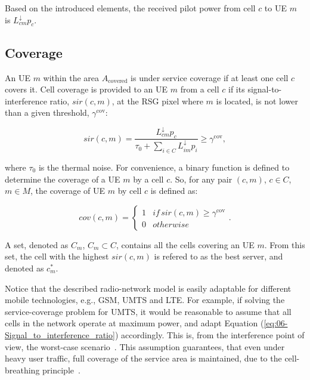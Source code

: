 Based on the introduced elements, the received pilot power from cell
$c$ to UE $m$ is $L_{cm}^{\downarrow}p_{c}$.


\subsection{Coverage}

An UE $m$ within the area $A_{\mathrm{covered}}$ is under service
coverage if at least one cell $c$ covers it. Cell coverage is provided
to an UE $m$ from a cell $c$ if its signal-to-interference ratio,
$sir(c,m)$,
at the RSG pixel where $m$ is located, is not lower than a given
threshold, $\gamma^{\mathrm{cov}}$:

\begin{equation}
sir(c,m)=\frac{L_{cm}^{\downarrow}p_{c}}{\tau_{0}+\sum_{i\in C}L_{im}^{\downarrow}p_{i}}\ge\gamma^{\mathrm{cov}},\label{eq:06-Signal_to_interference_ratio}
\end{equation}


\noindent where $\tau_{0}$ is the thermal noise. For convenience,
a binary function is defined to determine the coverage of a UE $m$
by a cell $c$. So, for any pair $(c,m)$, $c\in C$, $m\in M$, the
coverage of UE $m$ by cell $c$ is defined as:

\begin{equation}
cov(c,m)=\begin{cases}
1 & if\, sir(c,m)\ge\gamma^{\mathrm{cov}}\\
0 & otherwise
\end{cases}.
\end{equation}


\noindent {}

\noindent A set, denoted as $C_{m}$,
$C_{m}\subset C$, contains all the cells covering an UE $m$. From
this set, the cell with the highest $sir(c,m)$ is refered to as the
best server, and denoted as $c_{m}^{*}$.

\noindent Notice that the described radio-network model is easily
adaptable for different mobile technologies, e.g., GSM, UMTS and LTE.
For example, if solving the service-coverage problem for UMTS, it
would be reasonable to assume that all cells in the network operate
at maximum power, and adapt Equation (\ref{eq:06-Signal_to_interference_ratio})
accordingly. This is, from the interference point of view, the worst-case
scenario~\cite{Chen-Yuan_CPICH.optimization:2008,Siomina:Minimum.pilot.power.for.service.coverage}.
This assumption guarantees, that even under heavy user traffic, full
coverage of the service area is maintained, due to the cell-breathing
principle~\cite{Holma_WCDMA.for.UMTS:2005}.


